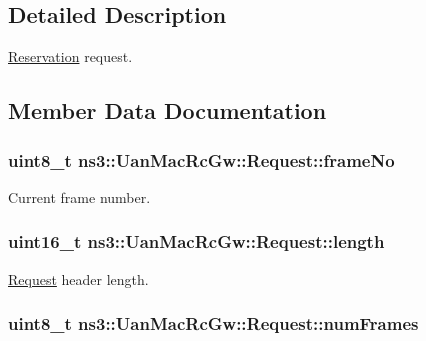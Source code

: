 \subsection{Detailed Description}
\hyperlink{classns3_1_1Reservation}{Reservation} request. 

\subsection{Member Data Documentation}
\subsubsection[{\texorpdfstring{frame\+No}{frameNo}}]{\setlength{\rightskip}{0pt plus 5cm}uint8\+\_\+t ns3\+::\+Uan\+Mac\+Rc\+Gw\+::\+Request\+::frame\+No}\hypertarget{structns3_1_1UanMacRcGw_1_1Request_aa4b2c7061c5f9823430e8fbccfaecc1a}{}\label{structns3_1_1UanMacRcGw_1_1Request_aa4b2c7061c5f9823430e8fbccfaecc1a}


Current frame number. 

\subsubsection[{\texorpdfstring{length}{length}}]{\setlength{\rightskip}{0pt plus 5cm}uint16\+\_\+t ns3\+::\+Uan\+Mac\+Rc\+Gw\+::\+Request\+::length}\hypertarget{structns3_1_1UanMacRcGw_1_1Request_a959b7215687070780714f08f0bb266b0}{}\label{structns3_1_1UanMacRcGw_1_1Request_a959b7215687070780714f08f0bb266b0}


\hyperlink{structns3_1_1UanMacRcGw_1_1Request}{Request} header length. 

\subsubsection[{\texorpdfstring{num\+Frames}{numFrames}}]{\setlength{\rightskip}{0pt plus 5cm}uint8\+\_\+t ns3\+::\+Uan\+Mac\+Rc\+Gw\+::\+Request\+::num\+Frames}\hypertarget{structns3_1_1UanMacRcGw_1_1Request_aa85e318edd82745cb5b6d844717b4d50}{}\label{structns3_1_1UanMacRcGw_1_1Request_aa85e318edd82745cb5b6d844717b4d50}


